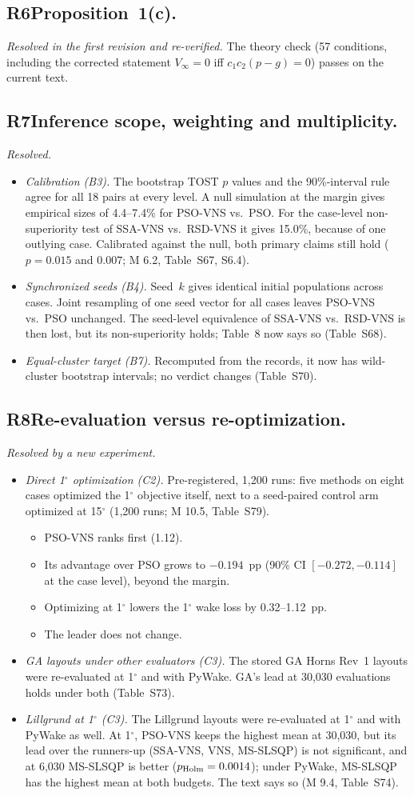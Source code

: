 \documentclass[11pt,a4paper]{article}
\newcommand{\concern}[2]{\subsection*{#1\quad #2}}
\begin{document}
\concern{R6}{Proposition~1(c).}
\emph{Resolved in the first revision and re-verified.} The theory check (57 conditions, including the corrected
statement $V_\infty=0$ iff $c_1c_2(p-g)=0$) passes on the current text.

\concern{R7}{Inference scope, weighting and multiplicity.}
\emph{Resolved.}
\begin{itemize}
\item \emph{Calibration (B3).} The bootstrap TOST $p$ values and the 90\%-interval rule agree for all 18 pairs at every
level. A null simulation at the margin gives empirical sizes of 4.4--7.4\% for PSO-VNS vs.\ PSO. For the case-level
non-superiority test of SSA-VNS vs.\ RSD-VNS it gives 15.0\%, because of one outlying case. Calibrated against the
null, both primary claims still hold ($p=0.015$ and $0.007$; M 6.2, Table~S67, S6.4).
\item \emph{Synchronized seeds (B4).} Seed~$k$ gives identical initial populations across cases. Joint resampling of
one seed vector for all cases leaves PSO-VNS vs.\ PSO unchanged. The seed-level equivalence of SSA-VNS vs.\ RSD-VNS is
then lost, but its non-superiority holds; Table~8 now says so (Table~S68).
\item \emph{Equal-cluster target (B7).} Recomputed from the records, it now has wild-cluster bootstrap intervals; no
verdict changes (Table~S70).
\end{itemize}

\concern{R8}{Re-evaluation versus re-optimization.}
\emph{Resolved by a new experiment.}
\begin{itemize}
\item \emph{Direct 1$^\circ$ optimization (C2).} Pre-registered, 1,200 runs: five methods on eight cases optimized
the 1$^\circ$ objective itself, next to a seed-paired control arm optimized at 15$^\circ$ (1,200 runs; M 10.5,
Table~S79).
\begin{itemize}
\item PSO-VNS ranks first (1.12).
\item Its advantage over PSO grows to $-0.194$~pp (90\% CI $[-0.272,-0.114]$ at the case level), beyond the margin.
\item Optimizing at 1$^\circ$ lowers the 1$^\circ$ wake loss by 0.32--1.12~pp.
\item The leader does not change.
\end{itemize}
\item \emph{GA layouts under other evaluators (C3).} The stored GA Horns Rev~1 layouts were re-evaluated at 1$^\circ$
and with PyWake. GA's lead at 30,030 evaluations holds under both (Table~S73).
\item \emph{Lillgrund at 1$^\circ$ (C3).} The Lillgrund layouts were re-evaluated at 1$^\circ$ and with PyWake as well.
At 1$^\circ$, PSO-VNS keeps the highest mean at 30,030, but its lead over the runners-up (SSA-VNS, VNS, MS-SLSQP) is
not significant, and at 6,030 MS-SLSQP is better ($p_{\rm Holm}=0.0014$); under PyWake, MS-SLSQP has the highest mean
at both budgets. The text says so (M 9.4, Table~S74).
\end{itemize}
\end{document}
